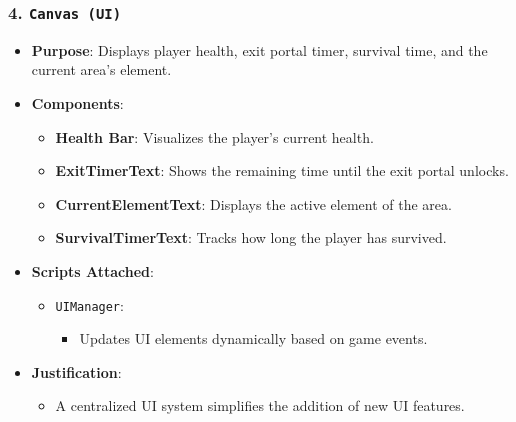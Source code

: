 \documentclass[10pt,twocolumn]{article}
\begin{document}
\subsubsection{4. \texttt{Canvas (UI)}}
\begin{itemize}
    \item \textbf{Purpose}: Displays player health, exit portal timer, survival time, and the current area's element.
    \item \textbf{Components}:
    \begin{itemize}
        \item \textbf{Health Bar}: Visualizes the player's current health.
        \item \textbf{ExitTimerText}: Shows the remaining time until the exit portal unlocks.
        \item \textbf{CurrentElementText}: Displays the active element of the area.
        \item \textbf{SurvivalTimerText}: Tracks how long the player has survived.
    \end{itemize}
    \item \textbf{Scripts Attached}:
    \begin{itemize}
        \item \texttt{UIManager}:
        \begin{itemize}
            \item Updates UI elements dynamically based on game events.
        \end{itemize}
    \end{itemize}
    \item \textbf{Justification}:
    \begin{itemize}
        \item A centralized UI system simplifies the addition of new UI features.
    \end{itemize}
\end{itemize}
\end{document}

